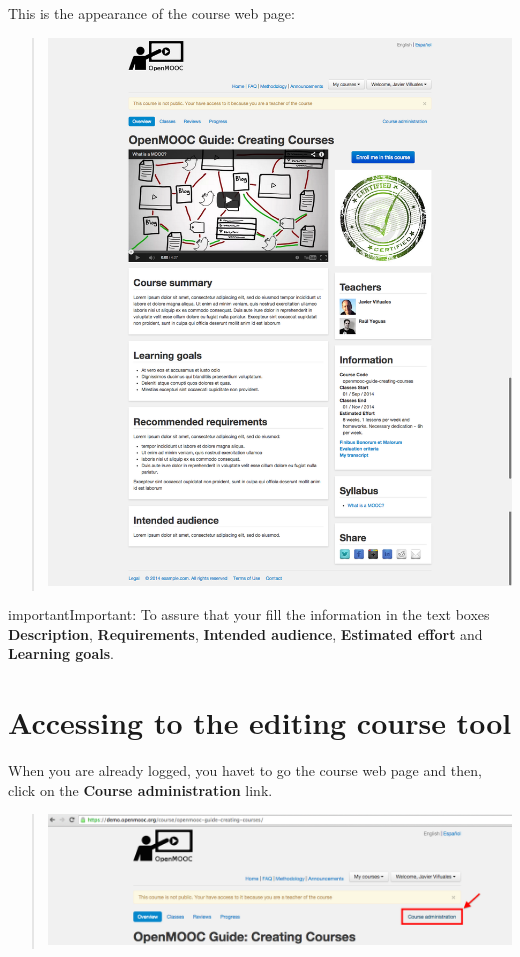 \documentclass[letterpaper,10pt,english]{sphinxmanual}
\begin{document}
This is the appearance of the course web page:
\begin{quote}

\includegraphics{7_course_view-1.png}
\end{quote}

\begin{notice}{important}{Important:}
To assure that your fill the information in the text boxes \textbf{Description},
\textbf{Requirements}, \textbf{Intended audience}, \textbf{Estimated effort} and \textbf{Learning goals}.
\end{notice}


\section{Accessing to the editing course tool}
\label{course_page:accessing-to-the-editing-course-tool}
When you are already logged, you havet to go the course web page and then, click on the \textbf{Course administration} link.
\begin{quote}

\includegraphics{2_course_information-0.png}
\end{quote}
\end{document}

